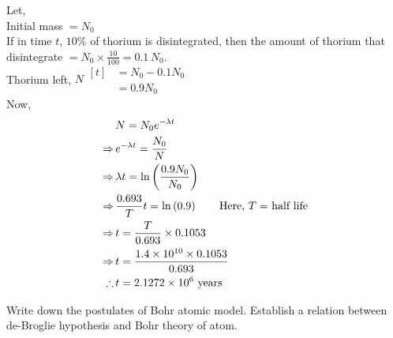 \documentclass[../main.tex]{subfiles}
\begin{document}
\begin{soln}
    Let,\\
    \indent Initial mass $ = N_0$\\
    If in time $ t, \,10\% $ of thorium is disintegrated, then the amount of thorium that disintegrate $ =N_0\times \frac{10}{100}=0.1\, N_0 $.\\
    \indent Thorium left, $ N\begin{aligned}[t]
        &=N_0-0.1N_0\\
        &=0.9 N_0    
    \end{aligned}
    $\\
    Now,
    \begin{align*}
        &N=N_0e^{-\lambda t}\\
        \Rightarrow\,&e^{-\lambda t}=\frac{N_0}{N}\\
        \Rightarrow\,&{\lambda t}=\ln \left( \frac{0.9 N_0}{N_0} \right)\\
        \Rightarrow\,&\frac{0.693}{T} t = \ln \left(0.9\right)\qquad\text{Here, $ T =$ half life}\\
        \Rightarrow\,&t = \frac{T}{0.693}\times 0.1053\\
        \Rightarrow\,&t = \frac{1.4\times 10^{10}\times 0.1053}{0.693}\\
        \therefore \,&t = 2.1272\times 10^{6}\text{ years}
    \end{align*}
\end{soln}
\newpage
\begin{prob}
    Write down the postulates of Bohr atomic model. Establish a relation between de-Broglie hypothesis and Bohr theory of atom.
\end{prob}
\end{document}
